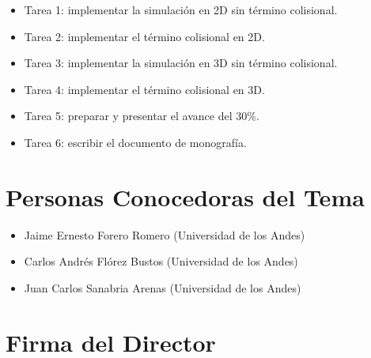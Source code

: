 \documentclass[12pt]{article}
\begin{document}
\begin{itemize}
	\item Tarea 1: implementar la simulación en 2D sin término colisional.
	\item Tarea 2: implementar el término colisional en 2D.
	\item Tarea 3: implementar la simulación en 3D sin término colisional.
    \item Tarea 4: implementar el término colisional en 3D.
    \item Tarea 5: preparar y presentar el avance del 30\%.
    \item Tarea 6: escribir el documento de monografía.
    
\end{itemize}

\section{Personas Conocedoras del Tema}


\begin{itemize}
	\item Jaime Ernesto Forero Romero (Universidad de los Andes)
	\item Carlos Andrés Flórez Bustos (Universidad de los Andes)
	\item Juan Carlos Sanabria Arenas (Universidad de los Andes)
\end{itemize}


{}


\section*{Firma del Director}
\vspace{1.5cm}
\end{document}
